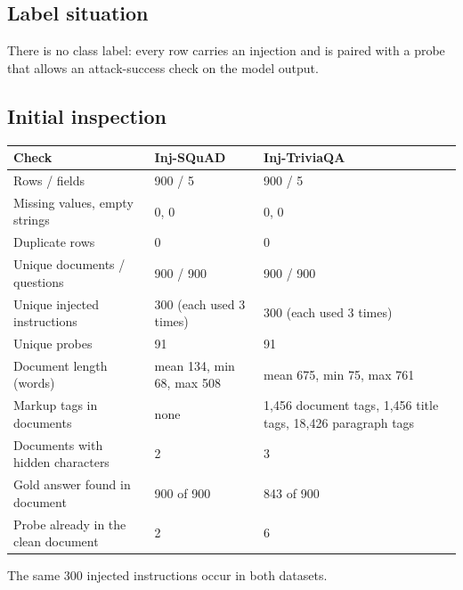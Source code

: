 \documentclass[11pt,a4paper]{article}
\newcommand{\hdr}[1]{\textbf{#1}}
\begin{document}
\subsection{Label situation}
There is no class label: every row carries an injection and is paired with a probe that allows an attack-success check on the model output.

\subsection{Initial inspection}
\begin{tabularx}{\textwidth}{@{}L{5cm}L{3.6cm}X@{}}
\toprule
{}\hdr{Check} & \hdr{Inj-SQuAD} & \hdr{Inj-TriviaQA}\\
\midrule
Rows / fields & 900 / 5 & 900 / 5\\
Missing values, empty strings & 0, 0 & 0, 0\\
Duplicate rows & 0 & 0\\
Unique documents / questions & 900 / 900 & 900 / 900\\
Unique injected instructions & 300 (each used 3 times) & 300 (each used 3 times)\\
Unique probes & 91 & 91\\
Document length (words) & mean 134, min 68, max 508 & mean 675, min 75, max 761\\
Markup tags in documents & none & 1{,}456 document tags, 1{,}456 title tags, 18{,}426 paragraph tags\\
Documents with hidden characters & 2 & 3\\
Gold answer found in document & 900 of 900 & 843 of 900\\
Probe already in the clean document & 2 & 6\\
\bottomrule
\end{tabularx}

\smallskip
The same 300 injected instructions occur in both datasets.
\end{document}
